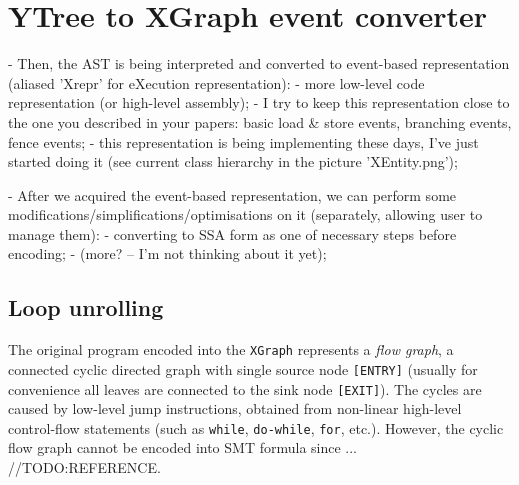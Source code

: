 \section{YTree to XGraph event converter}
\label{ch:impl:comp:xgraph}

- Then, the AST is being interpreted and converted to event-based representation (aliased 'Xrepr' for eXecution representation):
        - more low-level code representation (or high-level assembly);
        - I try to keep this representation close to the one you described in your papers: basic load \& store events, branching events, fence events;
        - this representation is being implementing these days, I've just started doing it (see current class hierarchy in the picture 'XEntity.png');
        
- After we acquired the event-based representation, we can perform some modifications/simplifications/optimisations on it (separately, allowing user to manage them):
        - converting to SSA form as one of necessary steps before encoding;
        - (more? -- I'm not thinking about it yet);
        
\subsection{Loop unrolling}
The original program encoded into the \texttt{XGraph} represents a \textit{flow graph}, a connected cyclic directed graph with single source node \texttt{[ENTRY]} (usually for convenience all leaves are connected to the sink node \texttt{[EXIT]}). The cycles are caused by low-level jump instructions, obtained from non-linear high-level control-flow statements (such as \texttt{while}, \texttt{do-while}, \texttt{for}, etc.). However, the cyclic flow graph cannot be encoded into SMT formula since ...
//TODO:REFERENCE.%



